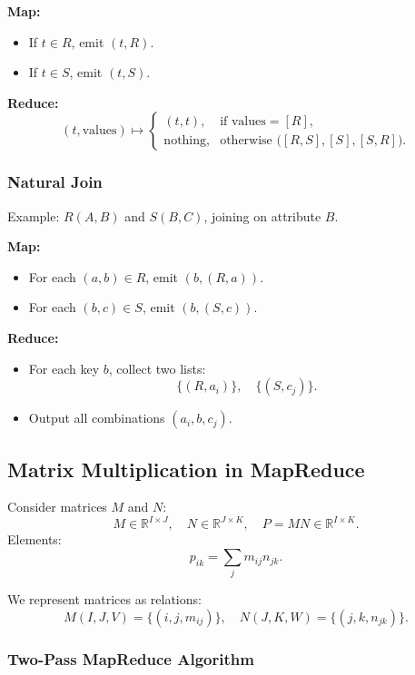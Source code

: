 \documentclass[11pt]{article}
\begin{document}
\textbf{Map:}
\begin{itemize}
    \item If $t \in R$, emit $(t, R)$.
    \item If $t \in S$, emit $(t, S)$.
\end{itemize}

\textbf{Reduce:}
\[
    (t, \text{values}) \mapsto
    \begin{cases}
        (t,t), & \text{if values} = [R],\\
        \text{nothing}, & \text{otherwise (} [R,S], [S], [S,R] \text{)}.
    \end{cases}
\]

\subsubsection*{Natural Join}

Example: $R(A,B)$ and $S(B,C)$, joining on attribute $B$.

\textbf{Map:}
\begin{itemize}
    \item For each $(a,b)\in R$, emit $(b, (R,a))$.
    \item For each $(b,c)\in S$, emit $(b, (S,c))$.
\end{itemize}

\textbf{Reduce:}
\begin{itemize}
    \item For each key $b$, collect two lists:
    \[
        \{(R,a_i)\},\quad \{(S,c_j)\}.
    \]
    \item Output all combinations $(a_i, b, c_j)$.
\end{itemize}

\subsection{Matrix Multiplication in MapReduce}

Consider matrices $M$ and $N$:
\[
    M \in \mathbb{R}^{I\times J},\quad N \in \mathbb{R}^{J\times K},\quad P = MN \in \mathbb{R}^{I\times K}.
\]
Elements:
\[
    p_{ik} = \sum_{j} m_{ij} n_{jk}.
\]

We represent matrices as relations:
\[
    M(I,J,V) = \{(i,j, m_{ij})\},\quad N(J,K,W) = \{(j,k, n_{jk})\}.
\]

\subsubsection*{Two-Pass MapReduce Algorithm}
\end{document}
